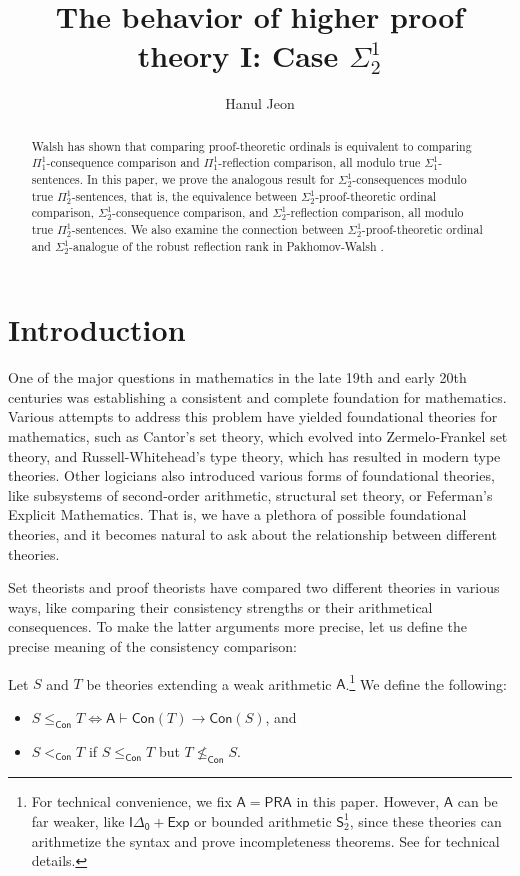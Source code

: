 \documentclass{mhkr}
\title{The behavior of higher proof theory I: Case $\Sigma^1_2$}
\author{Hanul Jeon}
\newcommand{\added}[1]{#1}
\newcommand{\Con}{\mathsf{Con}}
\begin{document}
\maketitle

\begin{abstract}
    Walsh \cite{Walsh2023characterizations} has shown that comparing proof-theoretic ordinals is equivalent to comparing $\Pi^1_1$-consequence comparison and  $\Pi^1_1$-reflection comparison, all modulo true $\Sigma^1_1$-sentences.
    In this paper, we prove the analogous result for $\Sigma^1_2$-consequences modulo true $\Pi^1_2$-sentences, that is, the equivalence between $\Sigma^1_2$-proof-theoretic ordinal comparison, $\Sigma^1_2$-consequence comparison, and $\Sigma^1_2$-reflection comparison, all modulo true $\Pi^1_2$-sentences. 
    We also examine the connection between $\Sigma^1_2$-proof-theoretic ordinal and $\Sigma^1_2$-analogue of the robust reflection rank in Pakhomov-Walsh \cite{PakhomovWalsh2021Reflection}.
\end{abstract}

\section{Introduction}

\added{
One of the major questions in mathematics in the late 19th and early 20th centuries was establishing a consistent and complete foundation for mathematics.
Various attempts to address this problem have yielded foundational theories for mathematics, such as Cantor's set theory, which evolved into Zermelo-Frankel set theory, and Russell-Whitehead's type theory, which has resulted in modern type theories. Other logicians also introduced various forms of foundational theories, like subsystems of second-order arithmetic, structural set theory, or Feferman's Explicit Mathematics. That is, we have a plethora of possible foundational theories, and it becomes natural to ask about the relationship between different theories. 

Set theorists and proof theorists have compared two different theories in various ways, like comparing their consistency strengths or their arithmetical consequences. 
To make the latter arguments more precise, let us define the precise meaning of the consistency comparison:
\begin{definition}
    Let $S$ and $T$ be theories extending a weak arithmetic $\mathsf{A}$.\footnote{For technical convenience, we fix $\mathsf{A} = \mathsf{PRA}$ in this paper. However, $\mathsf{A}$ can be far weaker, like $\mathsf{I\Delta_0 + Exp}$ or bounded arithmetic $\mathsf{S}^1_2$, since these theories can arithmetize the syntax and prove incompleteness theorems. See \cite[Chapter 7]{BussThesis} for technical details.}
    We define the following:
    \begin{itemize}
        \item $S \le_\Con T \iff \mathsf{A} \vdash \Con(T)\to \Con(S)$, and
        \item $S <_\Con T$ if $S \le_\Con T$ but $T\nleq_\Con S$.
    \end{itemize}
\end{definition}
}
\end{document}
